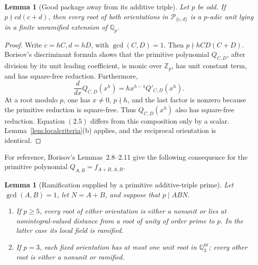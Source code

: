 \documentclass[11pt]{article}
\newtheorem{lemma}[theorem]{Lemma}
\theoremstyle{definition}
\newcommand{\Q}{\mathbb Q}
\newcommand{\Z}{\mathbb Z}
\newcommand{\Package}{\mathcal P}
\begin{document}
\begin{lemma}[Good package away from its additive triple]
\label{lem:goodpackage}
Let \(p\) be odd.  If \(p\nmid cd(c+d)\), then every root of both
orientations in \(\Package_{\{c,d\}}\) is a \(p\)-adic unit lying in a
finite unramified extension of \(\Q_p\).
\end{lemma}

\begin{proof}
Write \(c=hC,d=hD\), with \(\gcd(C,D)=1\).  Then
\(p\nmid hCD(C+D)\).  Borisov's discriminant formula
\cite[Lemma~2.1]{Borisov1998} shows that the primitive polynomial
\(Q_{C,D}\), after division by its unit leading coefficient, is monic over
\(\Z_p\), has unit constant term, and has square-free reduction.
Furthermore,
\[
 \frac{d}{dx}Q_{C,D}(x^h)=hx^{h-1}Q'_{C,D}(x^h).
\]
At a root modulo \(p\), one has \(x\neq0\), \(p\nmid h\), and the last
factor is nonzero because the primitive reduction is square-free.  Thus
\(Q_{C,D}(x^h)\) also has square-free reduction.  Equation \((2.5)\) differs
from this composition only by a scalar.  Lemma~\ref{lem:localcriteria}(b)
applies, and the reciprocal orientation is identical.
\end{proof}

For reference, Borisov's Lemmas~2.8--2.11 give the following consequence for
the primitive polynomial \(Q_{A,B}=f_{A+B,A,B}\).

\begin{lemma}[Ramification supplied by a primitive additive-triple prime]
\label{lem:borisovramification}
Let \(\gcd(A,B)=1\), let \(N=A+B\), and suppose that \(p\mid ABN\).
\begin{enumerate}[label=(\alph*)]
\item If \(p\geq5\), every root of either orientation is either a nonunit or
lies at nonintegral-valued distance from a root of unity of order prime to
\(p\).  In the latter case its local field is ramified.
\item If \(p=3\), each fixed orientation has at most one unit root in
\(\Q_3^{\mathrm{nr}}\); every other root is either a nonunit or ramified.
\end{enumerate}
\end{lemma}
\end{document}
